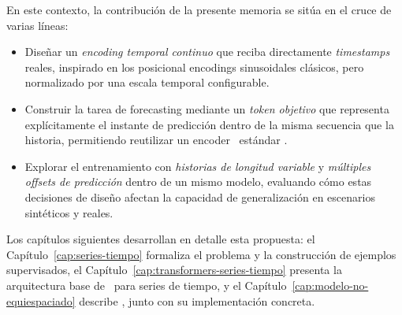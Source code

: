 En este contexto, la contribución de la presente memoria se sitúa en el cruce de varias líneas:
\begin{itemize}
    \item Diseñar un \textit{encoding temporal continuo} que reciba directamente \emph{timestamps} reales, inspirado en los posicional encodings sinusoidales clásicos, pero normalizado por una escala temporal configurable.
    \item Construir la tarea de forecasting mediante un \textit{token objetivo} que representa explícitamente el instante de predicción dentro de la misma secuencia que la historia, permitiendo reutilizar un encoder \Transformer\ estándar \cite{vaswani2017attention}.
    \item Explorar el entrenamiento con \textit{historias de longitud variable} y \textit{múltiples offsets de predicción} dentro de un mismo modelo, evaluando cómo estas decisiones de diseño afectan la capacidad de generalización en escenarios sintéticos y reales.
\end{itemize}

Los capítulos siguientes desarrollan en detalle esta propuesta: el Capítulo~\ref{cap:series-tiempo} formaliza el problema y la construcción de ejemplos supervisados, el Capítulo~\ref{cap:transformers-series-tiempo} presenta la arquitectura base de \Transformers\ para series de tiempo, y el Capítulo~\ref{cap:modelo-no-equiespaciado} describe \CTTransformer, junto con su implementación concreta.

